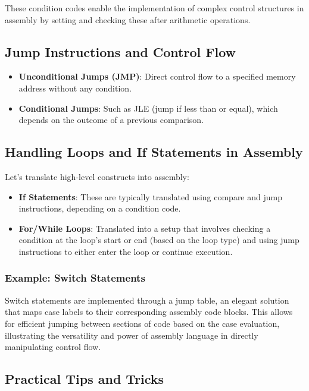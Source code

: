 \documentclass{article}
\begin{document}
These condition codes enable the implementation of complex control structures in assembly by setting and checking these after arithmetic operations.

\subsection{Jump Instructions and Control Flow}

\begin{itemize}
    \item \textbf{Unconditional Jumps (JMP)}: Direct control flow to a specified memory address without any condition.
    \item \textbf{Conditional Jumps}: Such as JLE (jump if less than or equal), which depends on the outcome of a previous comparison.
\end{itemize}

\subsection{Handling Loops and If Statements in Assembly}

Let's translate high-level constructs into assembly:

\begin{itemize}
    \item \textbf{If Statements}: These are typically translated using compare and jump instructions, depending on a condition code.
    \item \textbf{For/While Loops}: Translated into a setup that involves checking a condition at the loop's start or end (based on the loop type) and using jump instructions to either enter the loop or continue execution.
\end{itemize}

\subsubsection{Example: Switch Statements}

Switch statements are implemented through a jump table, an elegant solution that maps case labels to their corresponding assembly code blocks. This allows for efficient jumping between sections of code based on the case evaluation, illustrating the versatility and power of assembly language in directly manipulating control flow.

\subsection{Practical Tips and Tricks}
\end{document}
